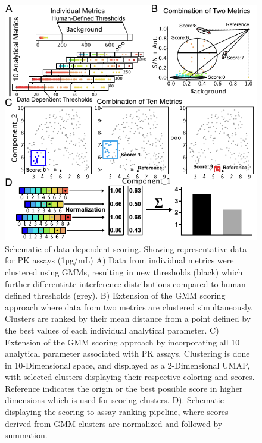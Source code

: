 \begin{figure}[H]
 \centering
 \includegraphics{graphics/ch3/Figure_5.pdf}
 \caption{Schematic of data dependent scoring.  Showing representative data for PK assays (1µg/mL) A) Data from individual metrics were clustered using GMMs, resulting in new thresholds (black) which further differentiate interference distributions compared to human-defined thresholds (grey).  B) Extension of the GMM scoring approach where data from two metrics are clustered simultaneously.  Clusters are ranked by their mean distance from a point defined by the best values of each individual analytical parameter.  C) Extension of the GMM scoring approach by incorporating all 10 analytical parameter associated with PK assays.  Clustering is done in 10-Dimensional space, and displayed as a 2-Dimensional UMAP, with selected clusters displaying their respective coloring and scores. Reference indicates the origin or the best possible score in higher dimensions which is used for scoring clusters.  D). Schematic displaying the scoring to assay ranking pipeline, where scores derived from GMM clusters are normalized and followed by summation.}
 \end{figure}

